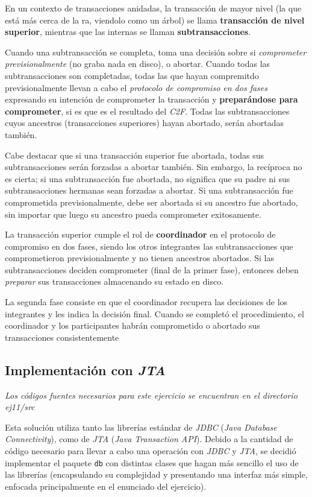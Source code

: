 En un contexto de transacciones anidadas, la transacción de mayor nivel (la que está más cerca de la ra, viendolo como un árbol) se llama \textbf{transacción de nivel superior}, mientras que las internas se llaman \textbf{subtransacciones}.  

Cuando una subtransacción se completa, toma una decisión sobre si \emph{comprometer previsionalmente} (no graba nada en disco), o abortar. Cuando todas las subtransacciones son completadas, todas las que hayan compremitdo previsionalmente llevan a cabo el \emph{protocolo de compromiso en dos fases} expresando su intención de comprometer la transacción y \textbf{preparándose para comprometer}, si es que es el resultado del \emph{C2F}. Todas las subtransacciones cuyos ancestros (transacciones superiores) hayan abortado, serán abortadas también.  

Cabe destacar que si una transacción superior fue abortada, todas sus subtransacciones serán forzadas a abortar también. Sin embargo, la recíproca no es cierta; si una subtransacción fue abortada, no significa que su padre ni sus subtransacciones hermanas sean forzadas a abortar. Si una subtransacción fue comprometida previsionalmente, debe ser abortada si su ancestro fue abortado, sin importar que luego su ancestro pueda comprometer exitosamente.

La transacción superior cumple el rol de \textbf{coordinador} en el protocolo de compromiso en dos fases, siendo los otros integrantes las subtransacciones que comprometieron previsionalmente y no tienen ancestros abortados. Si las subtransacciones deciden comprometer (final de la primer fase), entonces deben \emph{preparar} sus transacciones almacenando su estado en disco.

La segunda fase consiste en que el coordinador recupera las decisiones de los integrantes y les indica la decisión final. Cuando se completó el procedimiento, el coordinador y los participantes habrán comprometido o abortado sus transacciones consistentemente \autocite{ColourisTwoPhaseCommitProtocol}

\subsection{Implementación con \emph{JTA}}

\emph{Los códigos fuentes necesarios para este ejercicio se encuentran en el directorio \emph{ej11/src}} 

Esta solución utiliza tanto las librerías estándar de \emph{JDBC} (\emph{Java Database Connectivity}), como de \emph{JTA} (\emph{Java Transaction API}). Debido a la cantidad de código  necesario para llevar a cabo una operación con \emph{JDBC} y \emph{JTA}, se decidió implementar el paquete \texttt{db} con distintas clases que hagan más sencillo el uso de las librerías (encapsulando su complejidad y presentando una interfaz más simple, enfocada principalmente en el enunciado del ejercicio).   

